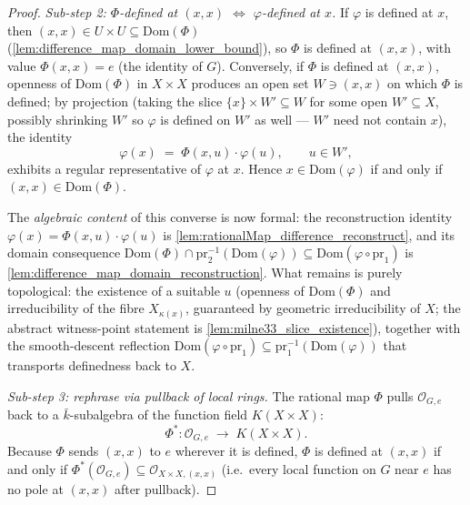 \begin{proof}
  \emph{Sub-step 2: \(\Phi\)-defined at \((x, x)\) \(\Leftrightarrow\) \(\varphi\)-defined at
  \(x\).} If \(\varphi\) is defined at \(x\), then \((x,x) \in U \times U \subseteq
  \mathrm{Dom}(\Phi)\) (\cref{lem:difference_map_domain_lower_bound}), so \(\Phi\) is
  defined at \((x, x)\), with value \(\Phi(x, x) = e\) (the identity of \(G\)). Conversely, if \(\Phi\) is
  defined at \((x, x)\), openness of \(\mathrm{Dom}(\Phi)\) in \(X \times X\) produces an
  open set \(W \ni (x, x)\) on which \(\Phi\) is defined; by projection (taking the slice
  \(\{x\} \times W' \subseteq W\) for some open \(W' \subseteq X\), possibly shrinking
  \(W'\) so \(\varphi\) is defined on \(W'\) as well --- \(W'\) need not contain \(x\)), the
  identity
  \[
    \varphi(x) \;=\; \Phi(x, u) \cdot \varphi(u),
    \qquad u \in W',
  \]
  exhibits a regular representative of \(\varphi\) at \(x\). Hence \(x \in
  \mathrm{Dom}(\varphi)\) if and only if \((x, x) \in \mathrm{Dom}(\Phi)\).

  The \emph{algebraic content} of this converse is now formal: the reconstruction
  identity \(\varphi(x) = \Phi(x,u) \cdot \varphi(u)\) is
  \cref{lem:rationalMap_difference_reconstruct}, and its domain consequence
  \(\mathrm{Dom}(\Phi) \cap \mathrm{pr}_2^{-1}(\mathrm{Dom}(\varphi)) \subseteq
  \mathrm{Dom}(\varphi \circ \mathrm{pr}_1)\) is
  \cref{lem:difference_map_domain_reconstruction}. What remains is purely topological: the
  existence of a suitable \(u\) (openness of \(\mathrm{Dom}(\Phi)\) and irreducibility of
  the fibre \(X_{\kappa(x)}\), guaranteed by geometric irreducibility of \(X\); the abstract
  witness-point statement is \cref{lem:milne33_slice_existence}), together
  with the smooth-descent reflection \(\mathrm{Dom}(\varphi \circ \mathrm{pr}_1) \subseteq
  \mathrm{pr}_1^{-1}(\mathrm{Dom}(\varphi))\) that transports definedness back to \(X\).

  \emph{Sub-step 3: rephrase via pullback of local rings.} The rational map \(\Phi\)
  pulls \(\mathcal O_{G, e}\) back to a \(\bar k\)-subalgebra of the function field
  \(K(X \times X)\):
  \[
    \Phi^\ast \colon \mathcal O_{G, e} \;\longrightarrow\; K(X \times X).
  \]
  Because \(\Phi\) sends \((x, x)\) to \(e\) wherever it is defined, \(\Phi\) is defined at
  \((x, x)\) if and only if \(\Phi^\ast(\mathcal O_{G, e}) \subseteq \mathcal O_{X
  \times X, (x, x)}\) (i.e.\ every local function on \(G\) near \(e\) has no pole at
  \((x, x)\) after pullback).


\end{proof}
